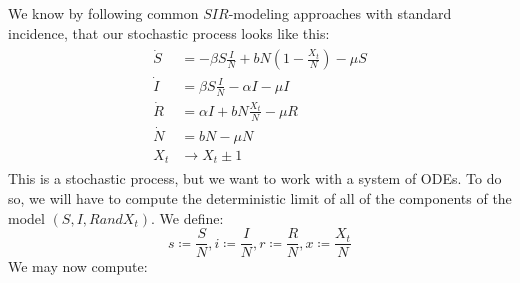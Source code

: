 \documentclass[10pt,a4paper]{article}
\begin{document}
	We know by following common $SIR$-modeling approaches with standard incidence, that our stochastic process looks like this:
	\begin{align}\label{def:my_model}
	\begin{split}
		\dot{S} &= -\beta S\frac{I}{N} + bN\left(1-\frac{X_t}{N}\right) - \mu S\\
		\dot{I} &= \beta S\frac{I}{N}  - \alpha I - \mu I\\
		\dot{R} &= \alpha I + bN\frac{X_t}{N} - \mu R\\
		\dot{N} &= bN - \mu N\\
		X_t &\rightarrow X_t \pm 1
		\end{split}
	\end{align}
	This is a stochastic process, but we want to work with a system of ODEs. To do so, we will have to compute the deterministic limit of all of the components of the model $(S,I, R and X_t)$. We define:
	\begin{equation}\label{def:scaled_variables_my_model}
		s\coloneqq \frac{S}{N}, i\coloneqq \frac{I}{N}, r\coloneqq \frac{R}{N}, x\coloneqq \frac{X_t}{N}
	\end{equation}
	We may now compute:
	
\end{document}
